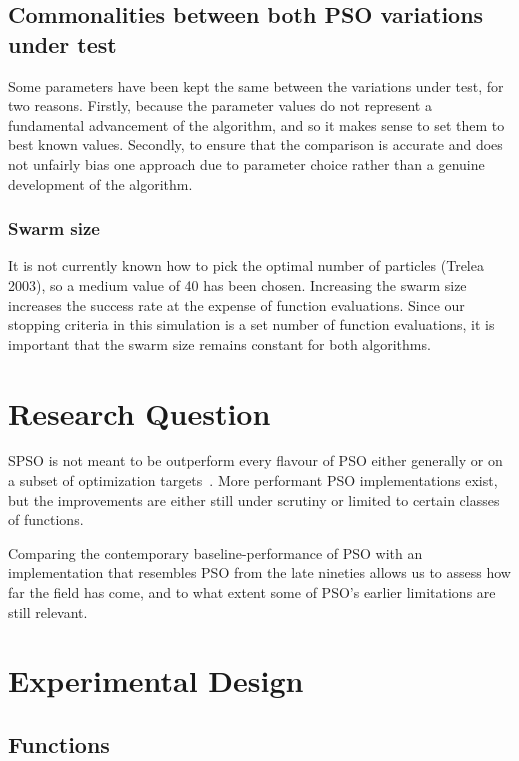 \documentclass{csfourzero}
\begin{document}
\subsection{Commonalities between both PSO variations under test}

Some parameters have been kept the same between the variations under test, for
two reasons. Firstly, because the parameter values do not represent a
fundamental advancement of the algorithm, and so it makes sense to set them to
best known values. Secondly, to ensure that the comparison is accurate and does
not unfairly bias one approach due to parameter choice rather than a genuine
development of the algorithm.

\subsubsection{Swarm size}

It is not currently known how to pick the optimal number of particles (Trelea
2003), so a medium value of 40 has been chosen. Increasing the swarm size
increases the success rate at the expense of function evaluations. Since our
stopping criteria in this simulation is a set number of function evaluations,
it is important that the swarm size remains constant for both algorithms.

\section{Research Question}

SPSO is not meant to be outperform every flavour of PSO either generally or on a
subset of optimization targets~\cite{Bratton:2007hq}. More performant PSO
implementations exist, but the improvements are either still under scrutiny or
limited to certain classes of functions.

Comparing the contemporary baseline-performance of PSO with an implementation
that resembles PSO from the late nineties allows us to assess how far the field
has come, and to what extent some of PSO's earlier limitations are still
relevant.



\section{Experimental Design}


\subsection{Functions}
\end{document}
